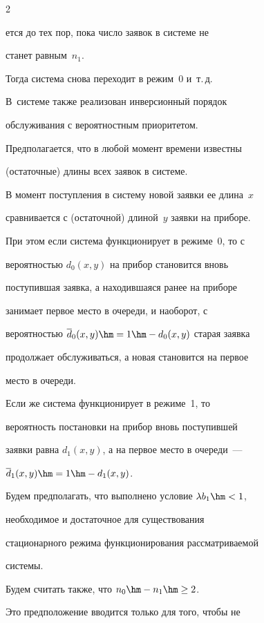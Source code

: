 \begin{multicols}{2}
\noindent


ется до тех пор, пока чис\-ло заявок в сис\-те\-ме не


станет равным~$n_1$.


Тогда система снова переходит в режим~0 и~т.\,д.








В~системе также реализован инверсионный порядок


обслуживания с вероятностным приоритетом.


Предполагается, что в любой момент времени известны


(остаточные) длины всех заявок в системе.


В момент поступления в систему новой заявки ее длина~$x$


сравнивается с (остаточной) длиной~$y$ заявки на приборе.


При этом если система функционирует в режиме~0, то с


вероятностью $d_0(x,y)$ на прибор становится вновь


поступившая заявка, а находившаяся ранее на приборе


занимает первое место в очереди, и наоборот, с


вероятностью $\d_0(x,y)\hm=1\hm-d_0(x,y)$ старая заявка


продолжает обслуживаться, а новая становится на первое


место в очереди.


Если же система функционирует в режиме~1, то


вероятность постановки на прибор вновь поступившей


заявки равна $d_1(x,y)$, а на первое мес\-то в очереди~---


$\d_1(x,y)\hm=1\hm-d_1(x,y)$.





Будем предполагать, что выполнено условие $\lambda b_1\hm<1$,


необходимое и достаточное для существования


стационарного режима функционирования рассматриваемой


системы.





Будем считать также, что $n_0\hm-n_1\hm\ge 2$.


Это предположение вводится только для того, чтобы не



\end{multicols}
